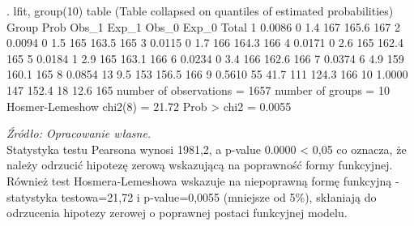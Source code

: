 \begin{stlog}

. lfit, group(10) table
{\smallskip}
{}
{\smallskip}
  (Table collapsed on quantiles of estimated probabilities)
  {\TLC}
  {\VBAR} Group {\VBAR}   Prob {\VBAR} Obs_1 {\VBAR} Exp_1 {\VBAR} Obs_0 {\VBAR} Exp_0 {\VBAR} Total {\VBAR}
  {\LFTT}
  {\VBAR}     1 {\VBAR} 0.0086 {\VBAR}     0 {\VBAR}   1.4 {\VBAR}   167 {\VBAR} 165.6 {\VBAR}   167 {\VBAR}
  {\VBAR}     2 {\VBAR} 0.0094 {\VBAR}     0 {\VBAR}   1.5 {\VBAR}   165 {\VBAR} 163.5 {\VBAR}   165 {\VBAR}
  {\VBAR}     3 {\VBAR} 0.0115 {\VBAR}     0 {\VBAR}   1.7 {\VBAR}   166 {\VBAR} 164.3 {\VBAR}   166 {\VBAR}
  {\VBAR}     4 {\VBAR} 0.0171 {\VBAR}     0 {\VBAR}   2.6 {\VBAR}   165 {\VBAR} 162.4 {\VBAR}   165 {\VBAR}
  {\VBAR}     5 {\VBAR} 0.0184 {\VBAR}     1 {\VBAR}   2.9 {\VBAR}   165 {\VBAR} 163.1 {\VBAR}   166 {\VBAR}
  {\LFTT}
  {\VBAR}     6 {\VBAR} 0.0234 {\VBAR}     0 {\VBAR}   3.4 {\VBAR}   166 {\VBAR} 162.6 {\VBAR}   166 {\VBAR}
  {\VBAR}     7 {\VBAR} 0.0374 {\VBAR}     6 {\VBAR}   4.9 {\VBAR}   159 {\VBAR} 160.1 {\VBAR}   165 {\VBAR}
  {\VBAR}     8 {\VBAR} 0.0854 {\VBAR}    13 {\VBAR}   9.5 {\VBAR}   153 {\VBAR} 156.5 {\VBAR}   166 {\VBAR}
  {\VBAR}     9 {\VBAR} 0.5610 {\VBAR}    55 {\VBAR}  41.7 {\VBAR}   111 {\VBAR} 124.3 {\VBAR}   166 {\VBAR}
  {\VBAR}    10 {\VBAR} 1.0000 {\VBAR}   147 {\VBAR} 152.4 {\VBAR}    18 {\VBAR}  12.6 {\VBAR}   165 {\VBAR}
  {\BLC}
{\smallskip}
       number of observations =      1657
             number of groups =        10
      Hosmer-Lemeshow chi2(8) =        21.72
                  Prob > chi2 =         0.0055
                 
\end{stlog}

\textit{\footnotesize{Źródło: Opracowanie własne.}} \\

Statystyka testu Pearsona wynosi 1981,2, a p-value 0.0000 < 0,05 co oznacza, że należy odrzucić hipotezę zerową wskazującą na poprawność formy funkcyjnej. Również test Hosmera-Lemeshowa wskazuje na niepoprawną formę funkcyjną - statystyka testowa=21,72 i p-value=0,0055 (mniejsze od 5\%), skłaniają do odrzucenia hipotezy zerowej o poprawnej postaci funkcyjnej modelu.

